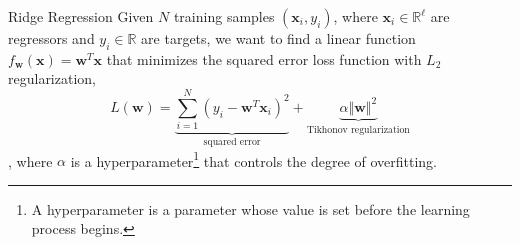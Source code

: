 \documentclass[aspectratio=169]{beamer}
\begin{document}

\begin{frame}{Ridge Regression}
Given $N$ training samples $(\mathbf{x}_i,y_i)$, where $\mathbf{x}_i\in\mathbb{R}^\ell$ are regressors and $y_i\in\mathbb{R}$ are targets, we want to find a linear function $f_\mathbf{w}(\mathbf{x})=\mathbf{w}^T\mathbf{x}$ that minimizes the squared error loss function with $L_2$ regularization,
\begin{equation}\label{eq:loss}
  L(\mathbf{w})=\underbrace{\sum_{i=1}^{N}(y_i-\mathbf{w}^T\mathbf{x}_i)^2}_\text{squared error}+\underbrace{\alpha\Vert\mathbf{w}\Vert^2}_\text{Tikhonov regularization}
\end{equation}
, where $\alpha$ is a hyperparameter\footnote{A hyperparameter is a parameter whose value is set before the learning process begins.} that controls the degree of overfitting.
\end{frame}
\end{document}
